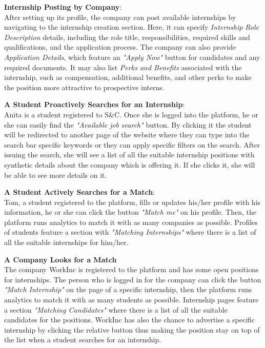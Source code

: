 {\begin{enumerate}[label=\textbf{[\arabic*]}, left = 0 pt, align = left]
\item \textbf{Internship Posting by Company}:                   %
\\After setting up its profile, the company can post available internships by navigating to the internship creation section. Here, it can specify \textit{Internship Role Description} details, including the role title, responsibilities, required skills and qualifications, and the application process.
The company can also provide \textit{Application Details}, which feature an \textit{"Apply Now"} button for candidates and any required documents. It may also list \textit{Perks and Benefits} associated with the internship, such as compensation, additional benefits, and other perks to make the position more attractive to prospective interns.

\item \textbf{A Student Proactively Searches for an Internship}:  %
\\Anita is a student registered to S\&C. Once she is logged into the platform, he or she can easily find the \textit{"Available job search"} button. By clicking it the student will be redirected to another page of the website where they can type into the search bar specific keywords or they can apply specific filters on the search. After issuing the search, she will see a list of all the suitable internship positions with synthetic details about the company which is offering it. If she clicks it, she will be able to see more details on it.

\item \textbf{A Student Actively Searches for a Match}:     %
\\Tom, a student registered to the platform, fills or updates his/her profile with his information, he or she can click the button \textit{"Match me"} on his profile. Then, the platform runs analytics to match it with as many companies as possible. Profiles of students feature a section with \textit{"Matching Internships"} where there is a list of all the suitable internships for him/her.

\item \textbf{A Company Looks for a Match}   
\\The company WorkInc is registered to the platform and has some open positions for internships. The person who is logged in for the company can click the button \textit{"Match Internship"} on the page of a specific internship, then the platform runs analytics to match it with as many students as possible. Internship pages feature a section \textit{"Matching Candidates"} where there is a list of all the suitable candidates for the positions. WorkInc has also the chance to advertise a specific internship by clicking the relative button thus making the position stay on top of the list when a student searches for an internship.


\end{enumerate}}
